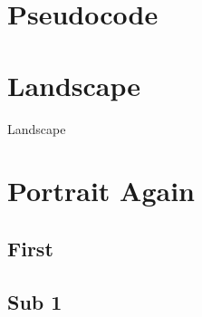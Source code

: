 \documentclass[11pt, twoside]{article}
\begin{document}

\thispagestyle{empty}


\newpage


\tableofcontents
{}\listoffigures
{}\listoftables
{}\listoflistings


\newpage

\section{Pseudocode}


\landscapepage
\section{Landscape}
Landscape

\portraitpage
\section{Portrait Again}
\cite{colu92}

\newpage


\nocite{*}
\printbibliography

\newpage

\begin{appendices}
      \section{First}
      \subsection{Sub 1}
\end{appendices}
\end{document}
